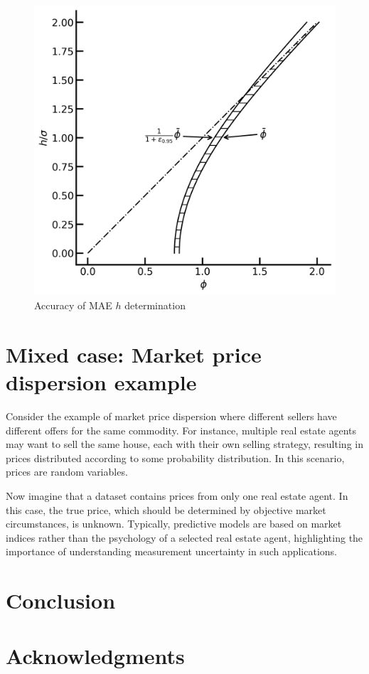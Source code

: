 \documentclass[12pt,a4paper]{article}
\theoremstyle{definition}
\begin{document}
\begin{figure}[H]
	\centering
	\includegraphics[width=0.5\linewidth]{img/h_phi}
	\caption{Accuracy of MAE $h$ determination}
	\label{fig:h_phi}
\end{figure}




\section{Mixed case: Market price dispersion example}

Consider the example of market price dispersion where different sellers have different offers for the same commodity. For instance, multiple real estate agents may want to sell the same house, each with their own selling strategy, resulting in prices distributed according to some probability distribution. In this scenario, prices are random variables.

Now imagine that a dataset contains prices from only one real estate agent. In this case, the true price, which should be determined by objective market circumstances, is unknown. Typically, predictive models are based on market indices rather than the psychology of a selected real estate agent, highlighting the importance of understanding measurement uncertainty in such applications.

\section{Conclusion}

\section{Acknowledgments}
\end{document}
